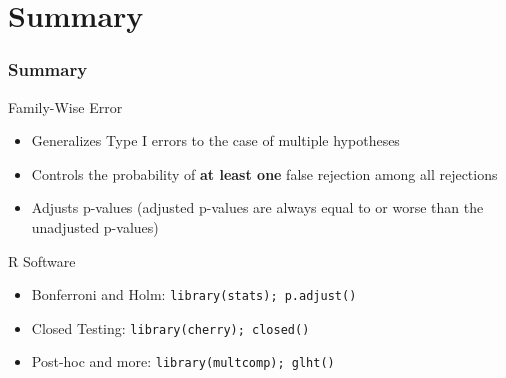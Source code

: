 \documentclass[xcolor={pdftex,dvipsnames,table}]{beamer}
\newcommand{\bb}[1]{\begin{block}{#1}}
\newcommand{\eb}{\end{block}}
\newcommand{\bi}{\begin {itemize}}
\newcommand{\ei}{\end{itemize}}
\newcommand{\bfr}[1]{\begin{frame} \frametitle{#1}}
\begin{document}
\section{Summary}
\bfr{Summary}
\bb{Family-Wise Error}
\bi
\item Generalizes Type I errors to the case of multiple hypotheses
\pause
\item Controls the probability of \textbf{at least one} false rejection among all rejections
\pause
\item Adjusts p-values (adjusted p-values are always equal to or worse than the unadjusted p-values)
\ei
\eb
\pause
\bb{R Software}
\bi
\item Bonferroni and Holm: {\tt library(stats); p.adjust()}
\item Closed Testing: {\tt library(cherry); closed()}
\item Post-hoc and more: {\tt library(multcomp); glht()}
\ei
\eb
\end{frame}
\end{document}
